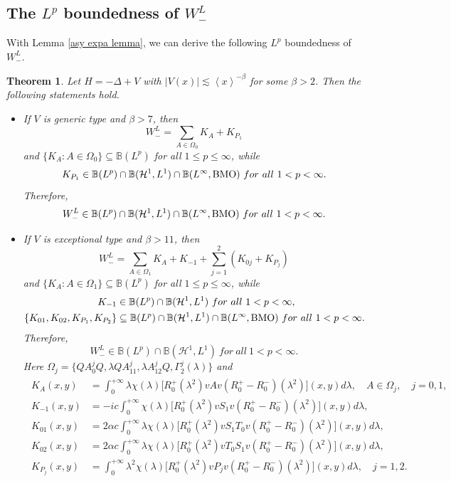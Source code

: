 \documentclass[reqno]{amsart}
\newtheorem{theorem}[definition]{Theorem}
\newcommand\B{\mathbb{B}}
\newcommand\HH{\mathcal{H}}
\numberwithin{equation}{section}
\begin{document}
\subsection{The $L^p$ boundedness of $W^L_{-}$}\label{subsec of lp bounds of low energy} With Lemma \ref{asy expa lemma}, we can derive the following $L^p$ boundedness of $W^L_{-}$.
\begin{theorem}\label{theorem of lp bounds of low energy} 
Let $H=-\Delta+V$ with $|V(x)|\lesssim \left<x\right>^{-\beta}$ for some $\beta>2$. Then the following statements hold.    \begin{itemize}
    \item [{\rm(i)}] If $V$ is generic type and $\beta>7$, then 
\begin{equation}\label{deco of regular}
W^{L}_{-}=\sum\limits_{A\in\Omega_0 }K_{A}+K_{{P_1}}
\end{equation}
and $\{K_A:A\in\Omega_0\}\subseteq\B(L^p)$ for all $1\leq p\leq\infty$, while 
$$ K_{{P_1}}\in \B(L^p)\cap\B(\HH^1,L^1)\cap\B(L^{\infty},{\rm BMO})\ for\ all\ 1<p<\infty.$$
Therefore, $$W^L_{-}\in\B(L^p)\cap\B(\HH^1,L^1)\cap\B(L^{\infty},{\rm BMO})\ for\ all\ 1<p<\infty.$$ 
\item [{\rm(ii)}] If $V$ is exceptional type and $\beta>11$, then 
\begin{equation}\label{deco of resonance}
W^{L}_{-}=\sum\limits_{A\in\Omega_1}K_A+K_{-1}+\sum\limits_{j=1}^{2}(K_{0j}+K_{{P_{j}}})   
\end{equation}
and $\{K_A:A\in\Omega_1\}\subseteq\B(L^p)$ for all $1\leq p\leq\infty$, while  
\begin{align*}
K_{-1}&\in\B(L^p)\cap\B(\HH^1,L^1)\ for\ all\ 1<p<\infty,\\
\{K_{01},K_{02},K_{{P_1}},K_{{P_2}}\}&\subseteq \B(L^p)\cap\B(\HH^1,L^1)\cap\B(L^{\infty},{\rm BMO})\ for\ all\ 1<p<\infty.
\end{align*}
Therefore,  $$W^L_{-}\in\B(L^p)\cap\B(\HH^1,L^1)\ for\ all\ 1<p<\infty.$$ 
Here $\Omega_j=\{QA^j_0Q,\lambda QA^j_{11},\lambda A^j_{12}Q, \Gamma^j_2(\lambda)\}$ and
\begin{align}\label{kernels in low energy}
\begin{split}
K_A(x,y)&=\int_{0}^{+\infty}\lambda\chi(\lambda)\big[R^+_0(\lambda^{2})vAv(R^+_0-R^-_0)(\lambda^{2})\big](x,y)d\lambda,\quad A\in\Omega_j,\quad j=0,1,\\
K_{-1}(x,y)&=-ic\int_{0}^{+\infty}\chi(\lambda)\big[R^+_0(\lambda^{2})vS_1v(R^+_0-R^-_0)(\lambda^{2})\big](x,y)d\lambda,\\
K_{01}(x,y)&=2\alpha c\int_{0}^{+\infty}\lambda\chi(\lambda)\big[R^+_0(\lambda^{2})vS_1T_0v(R^+_0-R^-_0)(\lambda^{2})\big](x,y)d\lambda,\\
K_{02}(x,y)&=2\alpha c\int_{0}^{+\infty}\lambda\chi(\lambda)\big[R^+_0(\lambda^{2})vT_0S_1v(R^+_0-R^-_0)(\lambda^{2})\big](x,y)d\lambda,\\
K_{P_{j}}(x,y)&=\int_{0}^{+\infty}\lambda^2\chi(\lambda)\big[R^+_0(\lambda^{2})vP_jv(R^+_0-R^-_0)(\lambda^{2})\big](x,y)d\lambda,\quad j=1,2.
\end{split}
\end{align}
\end{itemize}
\end{theorem}
\end{document}
